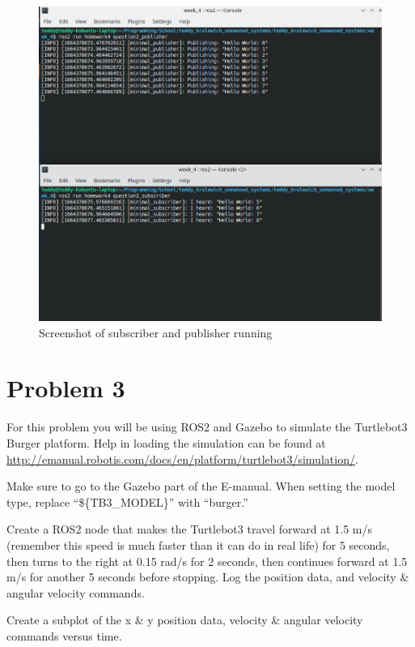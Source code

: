 \documentclass{article}
\begin{document}
\begin{figure}[H]
    \centering
    \includegraphics[width=\textwidth]{question2.png}
    \caption*{Screenshot of subscriber and publisher running}
\end{figure}

\bigskip
\section*{Problem 3}

For this problem you will be using ROS2 and Gazebo to simulate the Turtlebot3 Burger platform.  
Help in loading the simulation can be found at 
\url{http://emanual.robotis.com/docs/en/platform/turtlebot3/simulation/}.

\bigskip
\noindent Make sure to go to the Gazebo part of the E-manual. When setting the model type, replace “\$\{TB3\_MODEL\}” with 
“burger.” 

\bigskip
\noindent Create a ROS2 node that makes the Turtlebot3 travel forward at 1.5 m/s (remember this speed is 
much faster than it can do in real life) for 5 seconds, then turns to the right at 0.15 rad/s for 2 
seconds, then continues forward at 1.5 m/s for another 5 seconds before stopping. Log the position 
data, and velocity \& angular velocity commands.

\bigskip 
\noindent Create a subplot of the x \& y position data, velocity \& angular velocity commands versus time. 
\end{document}
